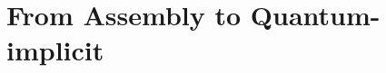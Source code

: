 \chapter[Publication: From Assembly to Quantum-implict]{From Assembly to Quantum-implicit}\label{ch:pub_qpl_systematic_review}





